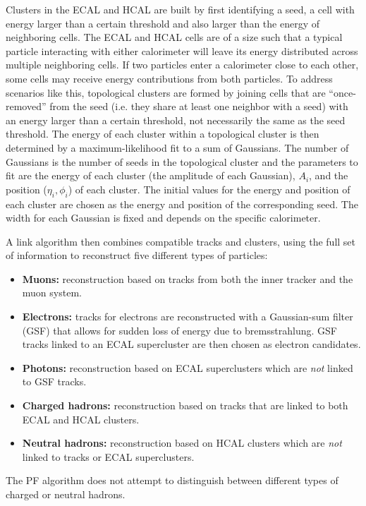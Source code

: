 Clusters in the ECAL and HCAL are built by first identifying a seed, a cell with energy larger than a certain threshold and also larger than the energy of neighboring cells.
The ECAL and HCAL cells are of a size such that a typical particle interacting with either calorimeter will leave its energy distributed across multiple neighboring cells.
If two particles enter a calorimeter close to each other, some cells may receive energy contributions from both particles.
To address scenarios like this, topological clusters are formed by joining cells that are ``once-removed'' from the seed (i.e. they share at least one neighbor with a seed) with an energy larger than a certain threshold, not necessarily the same as the seed threshold.
The energy of each cluster within a topological cluster is then determined by a maximum-likelihood fit to a sum of Gaussians.
The number of Gaussians is the number of seeds in the topological cluster and the parameters to fit are the energy of each cluster (the amplitude of each Gaussian), $A_i$, and the position ($\eta_i, \phi_i$) of each cluster.
The initial values for the energy and position of each cluster are chosen as the energy and position of the corresponding seed.
The width for each Gaussian is fixed and depends on the specific calorimeter.

A link algorithm then combines compatible tracks and clusters, using the full set of information to reconstruct five different types of particles:
\begin{itemize}
    \item \textbf{Muons:} reconstruction based on tracks from both the inner tracker and the muon system.
    \item \textbf{Electrons:} tracks for electrons are reconstructed with a Gaussian-sum filter (GSF) that allows for sudden loss of energy due to bremsstrahlung. GSF tracks linked to an ECAL supercluster are then chosen as electron candidates.
    \item \textbf{Photons:} reconstruction based on ECAL superclusters which are \emph{not} linked to GSF tracks.
    \item \textbf{Charged hadrons:} reconstruction based on tracks that are linked to both ECAL and HCAL clusters.
    \item \textbf{Neutral hadrons:} reconstruction based on HCAL clusters which are \emph{not} linked to tracks or ECAL superclusters.
\end{itemize}

The PF algorithm does not attempt to distinguish between different types of charged or neutral hadrons.
